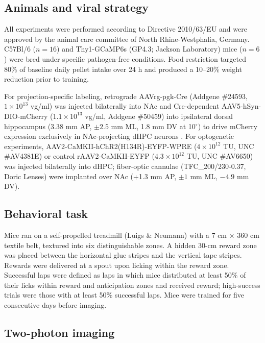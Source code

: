 \documentclass[11pt]{article}
\begin{document}
\subsection{Animals and viral strategy}

All experiments were performed according to Directive 2010/63/EU and were approved by the animal care committee of North Rhine-Westphalia, Germany. C57Bl/6 ($n=16$) and Thy1-GCaMP6s (GP4.3; Jackson Laboratory) mice ($n=6$) were bred under specific pathogen-free conditions. Food restriction targeted 80\% of baseline daily pellet intake over 24 h and produced a 10--20\% weight reduction prior to training.

For projection-specific labeling, retrograde AAVrg-pgk-Cre (Addgene \#24593, $1\times10^{13}$ vg/ml) was injected bilaterally into NAc and Cre-dependent AAV5-hSyn-DIO-mCherry ($1.1\times10^{13}$ vg/ml, Addgene \#50459) into ipsilateral dorsal hippocampus (3.38 mm AP, $\pm 2.5$ mm ML, 1.8 mm DV at 10$^\circ$) to drive mCherry expression exclusively in NAc-projecting dHPC neurons \citep{Tervo2016AAVretro}. For optogenetic experiments, AAV2-CaMKII-hChR2(H134R)-EYFP-WPRE ($4\times10^{12}$ TU, UNC \#AV4381E) or control rAAV2-CaMKII-EYFP ($4.3\times10^{12}$ TU, UNC \#AV6650) was injected bilaterally into dHPC; fiber-optic cannulae (TFC\_200/230-0.37, Doric Lenses) were implanted over NAc (+1.3 mm AP, $\pm 1$ mm ML, $-4.9$ mm DV).

\subsection{Behavioral task}

Mice ran on a self-propelled treadmill (Luigs \& Neumann) with a 7 cm $\times$ 360 cm textile belt, textured into six distinguishable zones. A hidden 30-cm reward zone was placed between the horizontal glue stripes and the vertical tape stripes. Rewards were delivered at a spout upon licking within the reward zone. Successful laps were defined as laps in which mice distributed at least 50\% of their licks within reward and anticipation zones and received reward; high-success trials were those with at least 50\% successful laps. Mice were trained for five consecutive days before imaging.

\subsection{Two-photon imaging}
\end{document}
